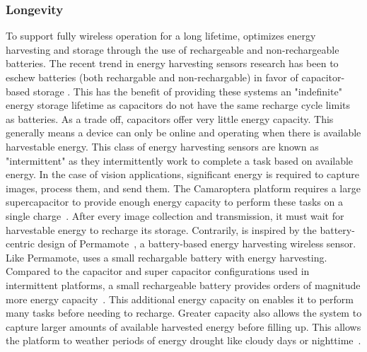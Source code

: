 \subsubsection{Longevity}
To support fully wireless operation for a long lifetime, \name optimizes energy harvesting and storage through the use of rechargeable and non-rechargeable batteries.
The recent trend in energy harvesting sensors research has been to eschew batteries (both rechargable and non-rechargable) in favor of capacitor-based storage \cite{naderiparizi2015wispcam,nardello2019camaroptera,colin2018reconfigurable,hester2017flicker}. This has the benefit of providing these systems an "indefinite" energy storage lifetime as capacitors do not have the same recharge cycle limits as batteries.
As a trade off, capacitors offer very little energy capacity. This generally means a device can only be online and operating when there is available harvestable energy. This class of energy harvesting sensors are known as "intermittent" as they intermittently work to complete a task based on available energy.
In the case of vision applications, significant energy is required to capture images, process them, and send them. The Camaroptera platform requires a large supercapacitor to provide enough energy capacity to perform these tasks on a single charge~\cite{nardello2019camaroptera}. After every image collection and transmission, it must wait for harvestable energy to recharge its storage.
Contrarily, \name is inspired by the battery-centric design of Permamote~\cite{jackson2019capacity}, a battery-based energy harvesting wireless sensor.
Like Permamote, \name uses a small rechargable battery with energy harvesting. 
Compared to the capacitor and super capacitor configurations used in intermittent platforms, a small rechargeable battery provides orders of magnitude more energy capacity~\cite{jackson2018reconsidering}.
This additional energy capacity on \name enables it to perform many tasks before needing to recharge. Greater capacity also allows the system to capture larger amounts of available harvested energy before filling up. This allows the platform to weather periods of energy drought like cloudy days or nighttime~\cite{jackson2019capacity}.


